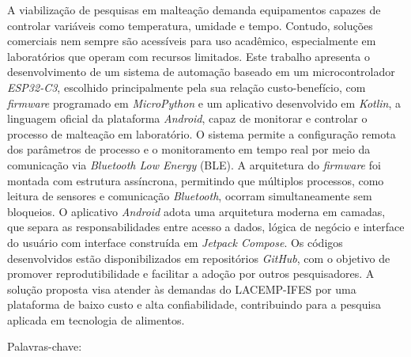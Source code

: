 \begin{resumo}
  \vspace{-15pt}
  
  A viabilização de pesquisas em malteação demanda equipamentos capazes de controlar variáveis como temperatura, umidade e tempo. Contudo, soluções comerciais nem sempre são acessíveis para uso acadêmico, especialmente em laboratórios que operam com recursos limitados. Este trabalho apresenta o desenvolvimento de um sistema de automação baseado em um microcontrolador \textit{ESP32-C3}, escolhido principalmente pela sua relação custo-benefício, com \textit{firmware} programado em \textit{MicroPython} e um aplicativo desenvolvido em \textit{Kotlin}, a linguagem oficial da plataforma \textit{Android}, capaz de monitorar e controlar o processo de malteação em laboratório. O sistema permite a configuração remota dos parâmetros de processo e o monitoramento em tempo real por meio da comunicação via \textit{Bluetooth Low Energy} (BLE). A arquitetura do \textit{firmware} foi montada com estrutura assíncrona, permitindo que múltiplos processos, como leitura de sensores e comunicação \textit{Bluetooth}, ocorram simultaneamente sem bloqueios. O aplicativo \textit{Android} adota uma arquitetura moderna em camadas, que separa as responsabilidades entre acesso a dados, lógica de negócio e interface do usuário com interface construída em \textit{Jetpack Compose}. Os códigos desenvolvidos estão disponibilizados em repositórios \textit{GitHub}, com o objetivo de promover reprodutibilidade e facilitar a adoção por outros pesquisadores. A solução proposta visa atender às demandas do LACEMP-IFES por uma plataforma de baixo custo e alta confiabilidade, contribuindo para a pesquisa aplicada em tecnologia de alimentos.

  Palavras-chave: \palavraschaveemlinha
\end{resumo}


